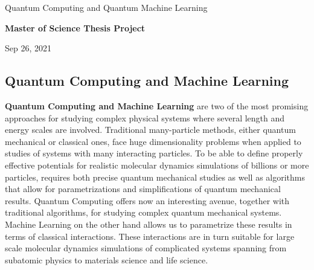 \documentclass[%
oneside,                 %
final,                   %
10pt]{article}
\begin{document}

\newcommand{\exercisesection}[1]{\subsection*{#1}}






\thispagestyle{empty}

\begin{center}
{\LARGE\bf
\begin{spacing}{1.25}
Quantum Computing and Quantum Machine Learning
\end{spacing}
}
\end{center}


\begin{center}
{\bf Master of Science Thesis Project${}^{}$} \\ [0mm]
\end{center}

\begin{center}
\end{center}
    

\begin{center}
Sep 26, 2021
\end{center}

\vspace{1cm}


\subsection{Quantum Computing and Machine Learning}



\textbf{Quantum Computing and Machine Learning} are two of the most promising
approaches for studying complex physical systems where several length
and energy scales are involved.  Traditional many-particle methods,
either quantum mechanical or classical ones, face huge dimensionality
problems when applied to studies of systems with many interacting
particles. To be able to define properly effective potentials for
realistic molecular dynamics simulations of billions or more
particles, requires both precise quantum mechanical studies as well as
algorithms that allow for parametrizations and simplifications of
quantum mechanical results. Quantum Computing offers now an
interesting avenue, together with traditional algorithms, for studying
complex quantum mechanical systems. Machine Learning on the other hand
allows us to parametrize these results in terms of classical
interactions. These interactions are in turn suitable for large scale
molecular dynamics simulations of complicated systems spanning from
subatomic physics to materials science and life science.
\end{document}
